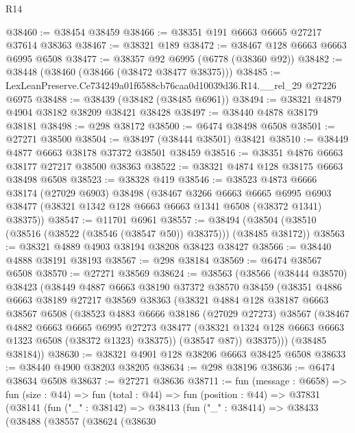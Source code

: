 \begin{lexlean}{R14}
\begin{coremodule}
@38460 := @38454 @38459
@38466 := @38351 @191 @6663 @6665 @27217 @37614 @38363
@38467 := @38321 @189
@38472 := @38467 @128 @6663 @6663 @6995 @6508
@38477 := @38357 @92 @6995 (@6778 (@38360 @92))
@38482 := @38448 (@38460 (@38466 (@38472 @38477 @38375)))
@38485 := LexLeanPreserve.Ce734249a01f6588cb76caa0d10039d36.R14.__rel_29 @27226 @6975
@38488 := @38439 (@38482 (@38485 @6961))
@38494 := @38321 @4879 @4904 @38182 @38209 @38421 @38428
@38497 := @38440 @4878 @38179 @38181
@38498 := @298 @38172
@38500 := @6474 @38498 @6508
@38501 := @27271 @38500
@38504 := @38497 (@38444 @38501) @38421
@38510 := @38449 @4877 @6663 @38178 @37372 @38501 @38459
@38516 := @38351 @4876 @6663 @38177 @27217 @38500 @38363
@38522 := @38321 @4874 @128 @38175 @6663 @38498 @6508
@38523 := @38328 @419
@38546 := @38523
    @4873
    @6666
    @38174
    (@27029 @6903)
    @38498
    (@38467
      @3266
      @6663
      @6665
      @6995
      @6903
      @38477
      (@38321 @1342 @128 @6663 @6663 @1341 @6508 (@38372 @1341) @38375))
@38547 := @11701 @6961
@38557 := @38494 (@38504 (@38510 (@38516 (@38522 (@38546 (@38547 @50)) @38375))) (@38485 @38172))
@38563 := @38321 @4889 @4903 @38194 @38208 @38423 @38427
@38566 := @38440 @4888 @38191 @38193
@38567 := @298 @38184
@38569 := @6474 @38567 @6508
@38570 := @27271 @38569
@38624 := @38563
    (@38566
      (@38444 @38570)
      @38423
      (@38449
        @4887
        @6663
        @38190
        @37372
        @38570
        @38459
        (@38351
          @4886
          @6663
          @38189
          @27217
          @38569
          @38363
          (@38321
            @4884
            @128
            @38187
            @6663
            @38567
            @6508
            (@38523
              @4883
              @6666
              @38186
              (@27029 @27273)
              @38567
              (@38467
                @4882
                @6663
                @6665
                @6995
                @27273
                @38477
                (@38321 @1324 @128 @6663 @6663 @1323 @6508 (@38372 @1323) @38375))
              (@38547 @87))
            @38375)))
      (@38485 @38184))
@38630 := @38321 @4901 @128 @38206 @6663 @38425 @6508
@38633 := @38440 @4900 @38203 @38205
@38634 := @298 @38196
@38636 := @6474 @38634 @6508
@38637 := @27271 @38636
@38711 := fun (message : @6658) =>
  fun (size : @44) =>
  fun (total : @44) =>
  fun (position : @44) =>
  @37831
    (@38141
      (fun ("_" : @38142) =>
      @38413
        (fun ("_" : @38414) =>
        @38433
          (@38488
            (@38557
              (@38624
                (@38630

\end{coremodule}
\end{lexlean}
